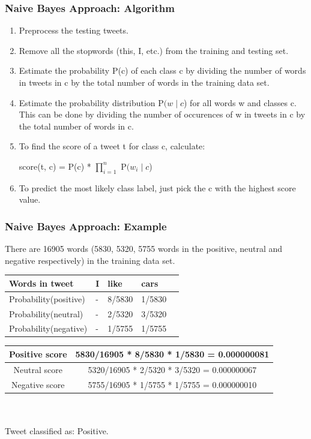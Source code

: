 \documentclass[12pt,xcolor=dvipsnames,table,titlepage]{beamer}
\begin{document}
\begin{frame}[t]
\frametitle{Naive Bayes Approach: Algorithm \cite{naivebayes}}
\begin{enumerate}
\item Preprocess the testing tweets.
\item Remove all the stopwords (this, I, etc.) from the training and testing set.
\item Estimate the probability P(c) of each class c by dividing the number of words in tweets in c by the total number of words in the training data set.
\item Estimate the probability distribution P\((w \mid c\)) for all words w and classes c. This can be done by dividing the number of occurences of w in tweets in c by the total number of words in c.
\item To find the score of a tweet t for class c, calculate: \\
\begin{center}
score(t, c) = P(c) * $\prod\limits_{i=1}^{n}$ P\((w_i \mid c\))
\end{center}
\item To predict the most likely class label, just pick the c with the highest score value.
\end{enumerate}
\end{frame}

\begin{frame}[t]
\frametitle{Naive Bayes Approach: Example}
There are 16905 words (5830, 5320, 5755 words in the positive, neutral and negative respectively) in the training data set.
\begin{table}[h]
\begin{tabular}{|l|l|l|l|l|}
\hline
Words in tweet  & I & like  & cars \\ \hline
Probability(positive) & -  & 8/5830    & 1/5830   \\ \hline
Probability(neutral) & -  & 2/5320  & 3/5320   \\ \hline
Probability(negative) & -  & 1/5755  & 1/5755   \\ \hline
\end{tabular}
\end{table}
\begin{table}[h]
\begin{tabular}{|c|c|}
\hline
Positive score & 5830/16905 * 8/5830 * 1/5830 = \textbf{0.000000081} \\ \hline
Neutral score  & 5320/16905 * 2/5320 * 3/5320 = 0.000000067 \\ \hline
Negative score & 5755/16905 * 1/5755 * 1/5755 = 0.000000010 \\ \hline
\end{tabular}
\\~
\\ Tweet classified as: Positive.
\end{table}
\end{frame}
\end{document}
